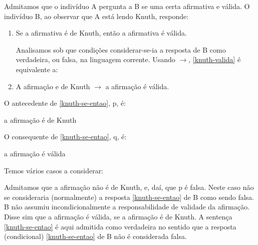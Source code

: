 \begin{enumerate}[label=\textbf{(\arabic*)}]
    \pagebreak

    Admitamos que o indivíduo A pergunta a B se uma certa afirmativa e válida.
    O indivíduo B, ao observar que A está lendo Knuth\footnotemark, responde:

    \begin{enumerate}[label=(\arabic*)]
        \item Se a afirmativa é de Knuth, então a afirmativa é válida. \label{knuth-valida}

        Analisamos sob que condições considerar-se-ia a resposta de B como verdadeira, ou  falsa, na  linguagem corrente.
        Usando $\to$, \ref{knuth-valida} é equivalente a:

        \item A afirmação e de Knuth $\to$ a afirmação é válida. \label{knuth-se-entao}
    \end{enumerate}

    O antecedente de \ref{knuth-se-entao}, p, é:

    \centerline{a afirmação é de Knuth}

    O consequente de \ref{knuth-se-entao}, q, é:

    \centerline{a afirmação é válida}

    Temos vários casos a considerar:


    Admitamos que a afirmação não é de Knuth, e, daí, que p é falsa.
    Neste caso não se consideraria (normalmente) a resposta \ref{knuth-se-entao} de B como sendo falsa.
    B não assumiu incondicionalmente a responsabilidade de validade da afirmação.
    Disse sim que a afirmação é válida, se a afirmação é de Knuth.
    A sentença \ref{knuth-se-entao} é aqui admitida como verdadeira no  sentido que a resposta (condicional) \ref{knuth-se-entao} de B não é considerada falsa.


\end{enumerate}
